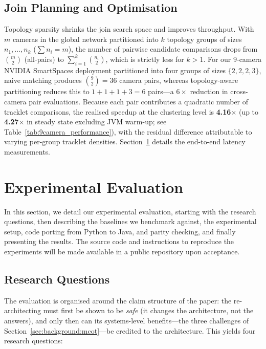 \documentclass[5p,times]{elsarticle}
\begin{document}
\subsection{Join Planning and Optimisation}
\label{sec:multi:joinplan}
Topology sparsity shrinks the join search space and improves throughput. With $m$ cameras in the global network partitioned into $k$ topology groups of sizes $n_1, \dots, n_k$ ($\sum n_i = m$), the number of pairwise candidate comparisons drops from $\binom{m}{2}$ (all-pairs) to $\sum_{i=1}^{k} \binom{n_i}{2}$, which is strictly less for $k > 1$. For our 9-camera NVIDIA SmartSpaces deployment partitioned into four groups of sizes $\{2, 2, 2, 3\}$, naive matching produces $\binom{9}{2} = 36$ camera pairs, whereas topology-aware partitioning reduces this to $1 + 1 + 1 + 3 = 6$ pairs---a $6\times$ reduction in cross-camera pair evaluations. Because each pair contributes a quadratic number of tracklet comparisons, the realised speedup at the clustering level is \textbf{4.16$\times$} (up to \textbf{4.27$\times$} in steady state excluding JVM warm-up; see Table~\ref{tab:9camera_performance}), with the residual difference attributable to varying per-group tracklet densities. Section~\ref{sec:evaluation} details the end-to-end latency measurements.


\section{Experimental Evaluation}\label{sec:evaluation}

In this section, we detail our experimental evaluation, starting with the research questions, then describing the baselines we benchmark against, the experimental setup, code porting from Python to Java, and parity checking, and finally presenting the results. The source code and instructions to reproduce the experiments will be made available in a public repository upon acceptance.


\subsection{Research Questions}
The evaluation is organised around the claim structure of the paper: the re-architecting must
first be shown to be \emph{safe} (it changes the architecture, not the answers), and only then
can its systems-level benefits---the three challenges of
Section~\ref{sec:background:mcot}---be credited to the architecture. This yields four research
questions:
 
\end{document}
